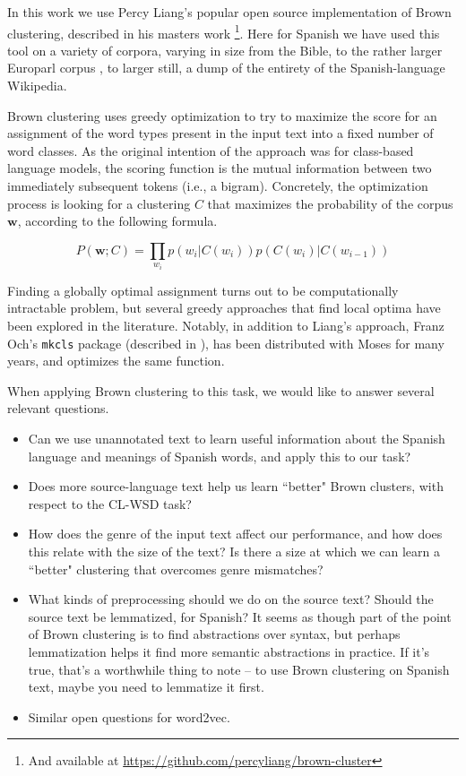 In this work we use Percy Liang's popular open source implementation of Brown
clustering, described in his masters work \cite{Liang05semi-supervisedlearning}
\footnote{And available at \url{https://github.com/percyliang/brown-cluster}}.
Here for Spanish we have used this tool on a variety of corpora, varying in
size from the Bible, to the rather larger Europarl corpus \cite{europarl}, to
larger still, a dump of the entirety of the Spanish-language Wikipedia.

Brown clustering uses greedy optimization to try to maximize the score for an
assignment of the word types present in the input text into a fixed number of
word classes. As the original intention of the approach was for class-based
language models, the scoring function is the mutual information between two
immediately subsequent tokens (i.e., a bigram). Concretely, the optimization
process is looking for a clustering $C$ that maximizes the probability of the
corpus $\boldsymbol{w}$, according to the following formula.

\begin{equation} \label{eq:brownclassprob}
P(\boldsymbol{w}; C) = \prod_{w_i} p(w_i | C(w_i)) p(C(w_i) | C(w_{i-1}))
\end{equation}

Finding a globally optimal assignment turns out to be computationally
intractable problem, but several greedy approaches that find local optima have
been explored in the literature.  Notably, in addition to Liang's approach,
Franz Och's \texttt{mkcls} package (described in \cite{och1999efficient}), has
been distributed with Moses for many years, and optimizes the same function.

When applying Brown clustering to this task, we would like to answer several
relevant questions.

\begin{itemize}
  \item Can we use unannotated text to learn useful information about the
  Spanish language and meanings of Spanish words, and apply this to our task?
  \item Does more source-language text help us learn ``better" Brown clusters,
    with respect to the CL-WSD task?
  \item How does the genre of the input text affect our performance, and how
  does this relate with the size of the text? Is there a size at which we
    can learn a ``better" clustering that overcomes genre mismatches?
  \item What kinds of preprocessing should we do on the source text? Should the
  source text be lemmatized, for Spanish? It seems as though part of the point
  of Brown clustering is to find abstractions over syntax, but perhaps
  lemmatization helps it find more semantic abstractions in practice.
  If it's true, that's a worthwhile thing to note -- to use Brown clustering on
  Spanish text, maybe you need to lemmatize it first.
  \item Similar open questions for word2vec.
\end{itemize}

